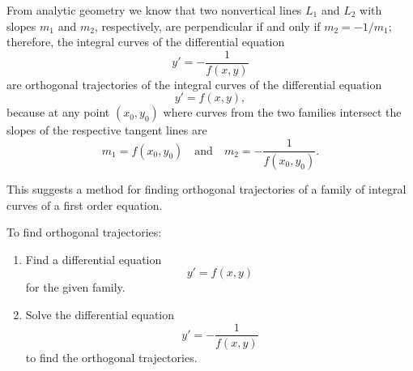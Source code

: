\documentclass{ximera}
\begin{document}
From analytic geometry we know that two nonvertical lines $L_1$ and
$L_2$ with slopes $m_1$ and $m_2$, respectively, are perpendicular if
and only if $m_2=-1/m_1$;  therefore, the integral curves of the
differential equation
$$
y'=-\frac{1}{f(x,y)}
$$
are orthogonal trajectories of the integral curves of the differential
equation
$$
y'=f(x,y),
$$
because at any point $(x_0,y_0)$ where curves from the two families
intersect the slopes of the respective tangent lines are
$$
m_1=f(x_0,y_0)\quad\mbox{and}\quad m_2=-\frac{1}{f(x_0,y_0)}.
$$

This suggests a  method for finding orthogonal trajectories
of a family of integral curves of a first order equation.

\begin{procedure}\label{proc:orthTraj}
To find orthogonal trajectories:
\begin{enumerate}
\item\label{item:orthTrajA}
Find a differential equation
$$
y'=f(x,y)
$$
 for the given family.

\item\label{item:orthTrajB}

Solve the differential equation
$$
y'=-\frac{1}{f(x,y)}
$$
to find the orthogonal trajectories.
\end{enumerate}
\end{procedure}
\end{document}
